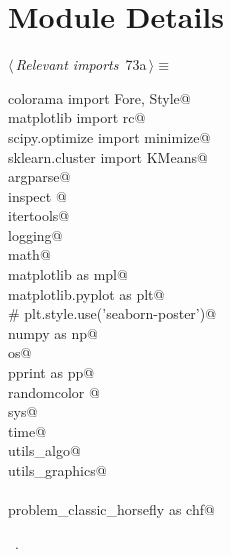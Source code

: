 \documentclass[11.5pt]{report}
\begin{document}
\section{Module Details}
\newchunk 
\begin{flushleft} \small
\begin{minipage}{\linewidth}\label{scrap100}\raggedright\small
{} $\langle\,${\itshape Relevant imports}\nobreak\ {\footnotesize {73a}}$\,\rangle\equiv$
\vspace{-1ex}
\begin{list}{}{} \item
\mbox{}\verb@from colorama import Fore, Style@\\
\mbox{}\verb@from matplotlib import rc@\\
\mbox{}\verb@from scipy.optimize import minimize@\\
\mbox{}\verb@from sklearn.cluster import KMeans@\\
\mbox{}\verb@import argparse@\\
\mbox{}\verb@import inspect @\\
\mbox{}\verb@import itertools@\\
\mbox{}\verb@import logging@\\
\mbox{}\verb@import math@\\
\mbox{}\verb@import matplotlib as mpl@\\
\mbox{}\verb@import matplotlib.pyplot as plt@\\
\mbox{}\verb@# plt.style.use('seaborn-poster')@\\
\mbox{}\verb@import numpy as np@\\
\mbox{}\verb@import os@\\
\mbox{}\verb@import pprint as pp@\\
\mbox{}\verb@import randomcolor @\\
\mbox{}\verb@import sys@\\
\mbox{}\verb@import time@\\
\mbox{}\verb@import utils_algo@\\
\mbox{}\verb@import utils_graphics@\\
\mbox{}\verb@@\\
\mbox{}\verb@import problem_classic_horsefly as chf@\\
\mbox{}\verb@@{\NWsep}
\end{list}
\vspace{-1.5ex}
\footnotesize
\begin{list}{}{\setlength{\itemsep}{-\parsep}\setlength{\itemindent}{-\leftmargin}}
\item \NWtxtMacroRefIn\ .

\item{}
\end{list}
\end{minipage}\vspace{4ex}
\end{flushleft}
\end{document}
